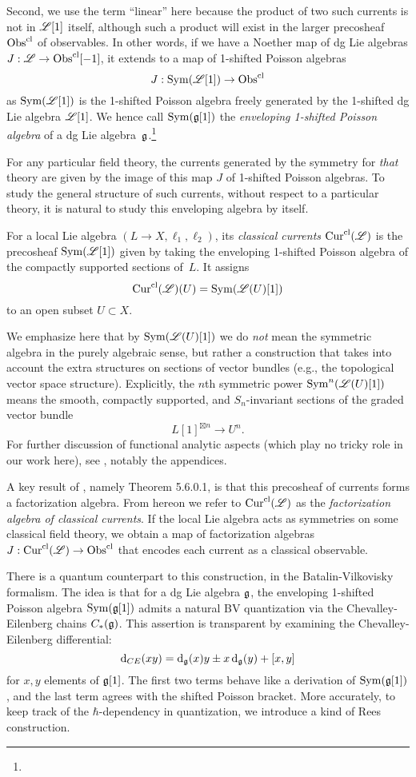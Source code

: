 Second, we use the term ``linear'' here because the product of two such currents is not in $\mathscr L[1]$ itself, 
although such a product will exist in the larger precosheaf ${\rm Obs}^{\rm cl}$ of observables.
In other words, if we have a Noether map of dg Lie algebras $J: \mathscr L \to {\rm Obs}^{\rm cl}[-1]$,
it extends to a map of 1-shifted Poisson algebras
\[
J: {\rm Sym}(\mathscr L[1]) \to {\rm Obs}^{\rm cl}
\]
as ${\rm Sym}(\mathscr L[1])$ is the 1-shifted Poisson algebra freely generated by the 1-shifted dg Lie algebra $\mathscr L[1]$.
We hence call ${\rm Sym}(\mathfrak g[1])$ the {\em enveloping 1-shifted Poisson algebra} of a dg Lie algebra~$\mathfrak g$.\footnote{}

For any particular field theory, the currents generated by the symmetry for {\em that} theory are given by the image of this map $J$ of 1-shifted Poisson algebras.
To study the general structure of such currents, without respect to a particular theory,
it is natural to study this enveloping algebra by itself.

\begin{dfn}
For a local Lie algebra $(L\to X, \ell_1,\ell_2)$, its {\em classical currents} ${\rm Cur}^{\rm cl}(\mathscr L)$ is the precosheaf ${\rm Sym}(\mathscr L[1])$ given by taking the enveloping 1-shifted Poisson algebra of the compactly supported sections of~$L$.
It assigns
\[
{\rm Cur}^{\rm cl}(\mathscr L)(U) = {\rm Sym}(\mathscr L(U)[1])
\]
to an open subset $U \subset X$. 
\end{dfn}

We emphasize here that by ${\rm Sym}(\mathscr L(U)[1])$ we do {\em not} mean the symmetric algebra in the purely algebraic sense, but rather a construction that takes into account the extra structures on sections of vector bundles (e.g., the topological vector space structure).
Explicitly, the $n$th symmetric power  ${\rm Sym}^n(\mathscr L(U)[1])$ means the smooth, compactly supported, and $S_n$-invariant sections of the graded vector bundle 
\[
L[1]^{\boxtimes n} \to U^n.
\]
For further discussion of functional analytic aspects (which play no tricky role in our work here),
see \cite{CG1}, notably the appendices.

A key result of \cite{CG1}, namely Theorem 5.6.0.1, is that this precosheaf of currents forms a factorization algebra. 
From hereon we refer to  ${\rm Cur}^{\rm cl}(\mathscr L)$ as the {\em factorization algebra of classical currents}.
If the local Lie algebra acts as symmetries on some classical field theory,
we obtain a map of factorization algebras $J: {\rm Cur}^{\rm cl}(\mathscr L) \to {\rm Obs}^{\rm cl}$ that encodes each current as a classical observable.

There is a quantum counterpart to this construction, in the Batalin-Vilkovisky formalism.
The idea is that for a dg Lie algebra $\mathfrak g$, 
the enveloping 1-shifted Poisson algebra ${\rm Sym}(\mathfrak g[1])$ admits a natural BV quantization via the Chevalley-Eilenberg chains $C_*(\mathfrak g)$.  
This assertion is transparent by examining the Chevalley-Eilenberg differential:
\[
{\rm d}_{CE}(xy) = {\rm d}_\mathfrak g(x)y \pm x\, {\rm d}_\mathfrak g(y) + [x,y]
\]
for $x,y$ elements of $\mathfrak g[1]$.
The first two terms behave like a derivation of ${\rm Sym}(\mathfrak g[1])$, 
and the last term agrees with the shifted Poisson bracket.
More accurately, to keep track of the $\hbar$-dependency in quantization,
we introduce a kind of Rees construction.

